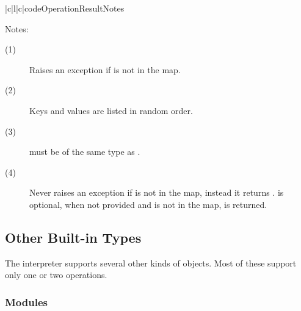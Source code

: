 \begin{tableiii}{|c|l|c|}{code}{Operation}{Result}{Notes}
\end{tableiii}
\renewcommand{\indexsubitem}{(dictionary method)}

\noindent
Notes:
\begin{description}
\item[(1)] Raises an exception if  is not in the map.

\item[(2)] Keys and values are listed in random order.

\item[(3)]  must be of the same type as .

\item[(4)] Never raises an exception if  is not in the map,
instead it returns .   is optional, when not provided
and  is not in the map,  is returned.
\end{description}

\subsection{Other Built-in Types}

The interpreter supports several other kinds of objects.
Most of these support only one or two operations.

\subsubsection{Modules}

